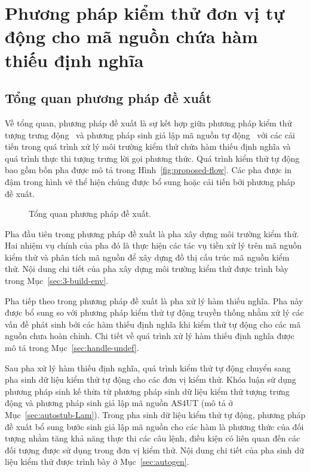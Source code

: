 \chapter{Phương pháp kiểm thử đơn vị tự động cho mã nguồn chứa hàm thiếu định nghĩa}\label{chap3}
\section{Tổng quan phương pháp đề xuất}\label{sec:tongquan}
Về tổng quan, phương pháp đề xuất là sự kết hợp giữa phương pháp kiểm thử tượng trưng động~\cite{ConcolicTesting} và phương pháp sinh giả lập mã nguồn tự động~\cite{TUNG2022106821} với các cải tiến trong quá trình xử lý môi trường kiểm thử chứa hàm thiếu định nghĩa và quá trình thực thi tượng trưng lời gọi phương thức. Quá trình kiểm thử tự động bao gồm bốn pha được mô tả trong Hình~\autoref{fig:proposed-flow}. Các pha được in đậm trong hình vẽ thể hiện chúng được bổ sung hoặc cải tiến bởi phương pháp đề xuất.

\begin{figure}[h]
    \centering
    
    \caption{Tổng quan phương pháp đề xuất.}
    \label{fig:proposed-flow}
\end{figure}

Pha đầu tiên trong phương pháp đề xuất là pha xây dựng môi trường kiểm thử. Hai nhiệm vụ chính của pha đó là thực hiện các tác vụ tiền xử lý trên mã nguồn kiểm thử và phân tích mã nguồn để xây dựng đồ thị cấu trúc mã nguồn kiểm thử. Nội dung chi tiết của pha xây dựng môi trường kiểm thử được trình bày trong Mục~\autoref{sec:3-build-env}.

Pha tiếp theo trong phương pháp đề xuất là pha xử lý hàm thiếu nghĩa. Pha này được bổ sung so với phương pháp kiểm thử tự động truyền thống nhằm xử lý các vấn đề phát sinh bởi các hàm thiếu định nghĩa khi kiểm thử tự động cho các mã nguồn chưa hoàn chỉnh. Chi tiết về quá trình xử lý hàm thiếu định nghĩa được mô tả trong Mục~\autoref{sec:handle-undef}.

Sau pha xử lý hàm thiếu định nghĩa, quá trình kiểm thử tự động chuyển sang pha sinh dữ liệu kiểm thử tự động cho các đơn vị kiểm thử. Khóa luận sử dụng phương pháp sinh kế thừa từ phương pháp sinh dữ liệu kiểm thử tượng trưng động và phương pháp sinh giả lập mã nguồn AS4UT (mô tả ở Mục~\autoref{sec:autostub-Lam}). Trong pha sinh dữ liệu kiểm thử tự động, phương pháp đề xuất bổ sung bước sinh giả lập mã nguồn cho các hàm là phương thức của đối tượng nhằm tăng khả năng thực thi các câu lệnh, điều kiện có liên quan đến các đối tượng được sử dụng trong đơn vị kiểm thử. Nội dung chi tiết của pha sinh dữ liệu kiểm thử được trình bày ở Mục~\autoref{sec:autogen}. 

